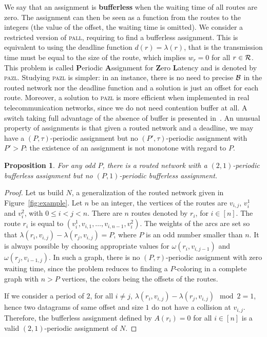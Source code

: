 \documentclass[a4paper,10pt]{journal}
\newtheorem{proposition}{Proposition}
\newcommand\pazl{\textsc{pazl}\xspace}
\newcommand\pall{\textsc{pall}\xspace}
\begin{document}
	 We say that an assignment is \textbf{bufferless} when the waiting time of all routes are zero.
	 The assignment can then be seen as a function from the routes to the integers (the value of the offset, the waiting time is omitted). We consider a restricted version of \pall, requiring to find a bufferless assignment. This is equivalent to using the deadline function $d(r) = \lambda(r)$, that is the transmission time must be equal to the size of the route, which implies $w_r = 0$ for all $r \in \cal{R}$. This problem is called \textbf{P}eriodic \textbf{A}ssignment for \textbf{Z}ero \textbf{L}atency and is denoted by \pazl. Studying \pazl is simpler: in an instance, there is no need to precise $\cal{B}$ in the routed network nor the deadline function and a solution is just an offset for each route.  Moreover, a solution to \pazl is more efficient when implemented in real telecommunication networks, since we do not need contention buffer at all. A switch taking full advantage of the absence of buffer is presented in~\cite{guiraud_phd}. 
      An unusual property of assignments is that given a routed network and a deadline, we may have a $(P,\tau)$-periodic assignment but no $(P',\tau)$-periodic assignment with $P' > P$: the existence of an assignment is not monotone with regard to $P$.

	\begin{proposition} \label{prop:monotonic}
	 For any odd $P$, there is a routed network with a $(2,1)$-periodic bufferless assignment but no $(P,1)$-periodic bufferless assignment.
	\end{proposition}

	\begin{proof}
      Let us build $N$, a generalization of the routed network given in Figure~\ref{fig:example}. 
      Let $n$ be an integer, the vertices of the routes are $v_{i,j}$, $v_i^1$ and $v_i^2$, with $0 \leq i < j <n$. 
      There are $n$ routes denoted by $r_i$, for $i \in [n]$. The route $r_i$ is equal to $(v_i^1,v_{i,1},\dots,v_{i,n-1},v_i^2)$. The weights of the arcs are set so that $\lambda(r_i, v_{i,j}) - \lambda(r_j,v_{i,j})= P$, where $P$ is an odd number smaller than $n$. It is always possible by choosing appropriate values for $\omega(r_i,v_{i,j-1})$ and $\omega(r_j,v_{i-1,j})$. In such a graph, there is no $(P,\tau)$-periodic assignment with zero waiting time, since the problem reduces to finding a $P$-coloring in a complete graph with $n > P$ vertices, the colors being the offsets of the routes.


      If we consider a period of $2$, for all $i \neq j$, $\lambda(r_i, v_{i,j}) - \lambda(r_j, v_{i,j}) \mod 2 = 1$, hence two datagrams of same offset and size $1$ do not have a collision at $v_{i,j}$. Therefore, the bufferless assignment defined by $A(r_i) = 0$ for all $i \in [n]$ is a valid $(2,1)$-periodic assignment of $N$.      
\end{proof}
\end{document}
